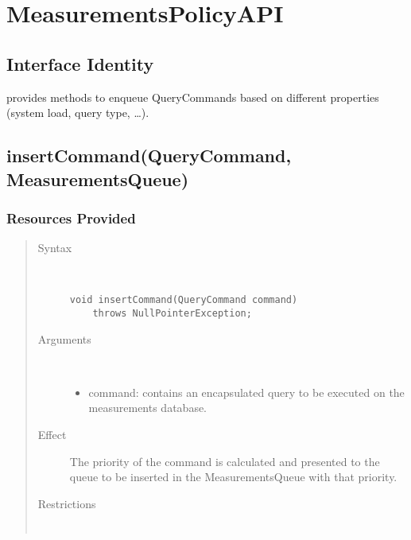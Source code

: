 \section{MeasurementsPolicyAPI}

\subsection{Interface Identity}

\npar {} provides methods to enqueue
QueryCommands based on different properties (system load, query type, \ldots).

\subsection{insertCommand(QueryCommand, MeasurementsQueue)}

\subsubsection{Resources Provided}

\begin{quote}
	\begin{description}
		\item[Syntax] \ 
		\begin{verbatim}
void insertCommand(QueryCommand command) 
    throws NullPointerException;
		\end{verbatim}
		\item[Arguments] \
		\begin{itemize}
			\item command: contains an encapsulated query to be executed on the
			measurements database.
		\end{itemize}
		\item[Effect] The priority of the command is calculated and presented to the
		queue to be inserted in the MeasurementsQueue with that priority.
		\item[Restrictions] \ 
		\begin{itemize}
			\item The given command is not null.
		\end{itemize}
	\end{description} 
\end{quote}

\subsubsection{Data Types Definition}

